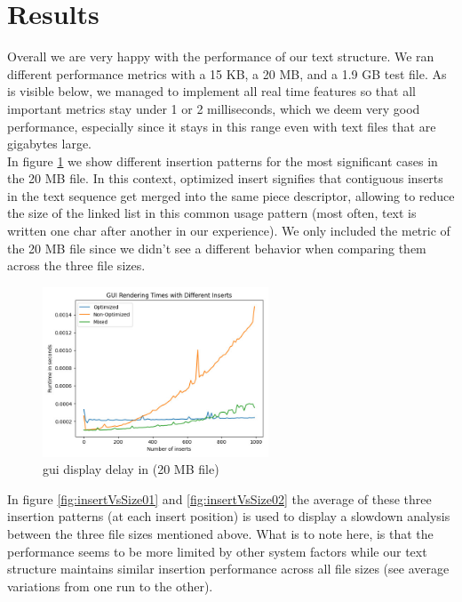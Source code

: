 \section{Results}\label{sec:results}

Overall we are very happy with the performance of our text structure. We ran different performance metrics with a 15 KB, a 20 MB, and a 1.9 GB test file. As is visible below, we managed to implement all real time features so that all important metrics stay under 1 or 2 milliseconds, which we deem very good performance, especially since it stays in this range even with text files that are gigabytes large.
\\In figure \ref{fig:renderMetric} we show different insertion patterns for the most significant cases in the 20 MB file. In this context, optimized insert signifies that contiguous inserts in the text sequence get merged into the same piece descriptor, allowing to reduce the size of the linked list in this common usage pattern (most often, text is written one char after another in our experience). We only included the metric of the 20 MB file since we didn't see a different behavior when comparing them across the three file sizes.
\begin{figure}[H]
    \centering
    \includegraphics[width=0.6\textwidth]{./images/Profiler-Render-Metric-Size1.jpg}
    \caption{gui display delay in (20 MB file)}
    \label{fig:renderMetric}
\end{figure}
In figure \ref{fig:insertVsSize01} and \ref{fig:insertVsSize02} the average of these three insertion patterns (at each insert position) is used to display a slowdown analysis between the three file sizes mentioned above. What is to note here, is that the performance seems to be more limited by other system factors while our text structure maintains similar insertion performance across all file sizes (see average variations from one run to the other).
